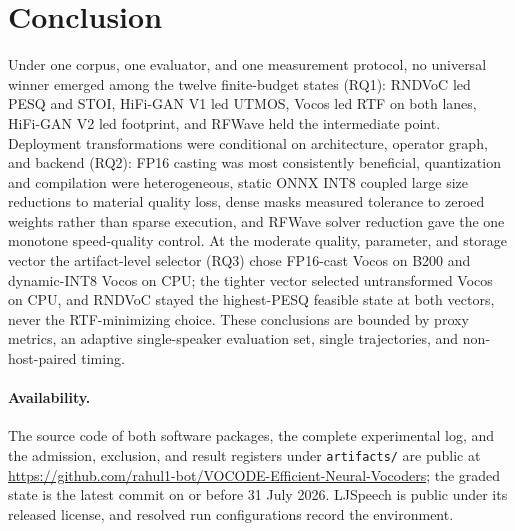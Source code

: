 \section{Conclusion}
\label{sec:conclusion}

Under one corpus, one evaluator, and one measurement protocol, no universal
winner emerged among the twelve finite-budget states (RQ1): RNDVoC
led PESQ and STOI, HiFi-GAN V1 led UTMOS, Vocos led RTF on both lanes,
HiFi-GAN V2 led footprint, and RFWave held the intermediate point.  Deployment transformations were conditional on architecture, operator
graph, and backend (RQ2): FP16 casting was most consistently beneficial,
quantization and compilation were heterogeneous, static ONNX INT8 coupled
large size reductions to material quality loss, dense masks measured
tolerance to zeroed weights rather than sparse execution, and RFWave
solver reduction gave the one monotone speed-quality control.  At the moderate quality, parameter, and storage
vector the artifact-level selector (RQ3) chose FP16-cast Vocos on B200
and dynamic-INT8 Vocos on CPU; the tighter vector selected untransformed
Vocos on CPU, and RNDVoC stayed the highest-PESQ feasible state at both
vectors, never the RTF-minimizing choice.  These conclusions are bounded
by proxy metrics, an adaptive single-speaker evaluation set, single
trajectories, and non-host-paired timing.

\paragraph{Availability.}
The source code of both software packages, the complete experimental
log, and the admission, exclusion, and result registers under
\texttt{artifacts/} are public at
\url{https://github.com/rahul1-bot/VOCODE-Efficient-Neural-Vocoders}; the
graded state is the latest commit on or before 31 July 2026.  LJSpeech is
public under its released license, and resolved run configurations record
the environment.
